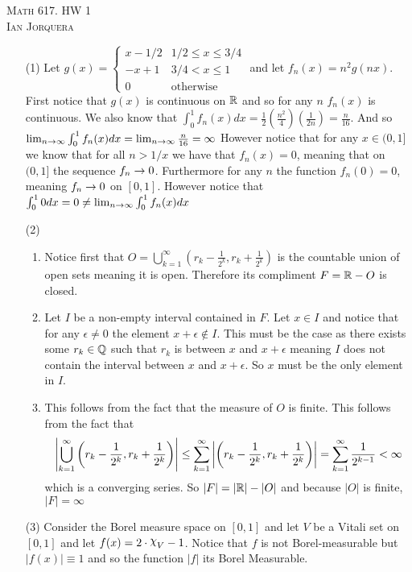 \documentclass[12pt]{amsart}
\DeclareRobustCommand{\rchi}{{\mathpalette\irchi\relax}}
\newcommand{\irchi}[2]{\raisebox{\depth}{$#1\chi$}} %
\begin{document}
\begin{center}
   \textsc{Math 617. HW 1\\ Ian Jorquera}
\end{center}
\vspace{1em}

\begin{itemize}
   \item[(1)] 
   Let $g(x)=\begin{cases}
    x-1/2 & 1/2\leq x\leq 3/4\\
    -x+1 & 3/4< x\leq 1\\
    0 & \text{otherwise}
   \end{cases}$ and let $f_n(x)=n^2g(nx)$. First notice that $g(x)$ is continuous on $\mathbb{R}$ and so for any $n$ $f_n(x)$ is continuous.
   We also know that $\int_0^1f_n(x)dx=\frac{1}{2}(\frac{n^2}{4})(\frac{1}{2n})=\frac{n}{16}$. And so 
   $\lim_{n\rightarrow\infty}\int_0^1f_n(x)dx=\lim_{n\rightarrow\infty}\frac{n}{16}=\infty$
   However notice that for any $x\in(0,1]$ we know that for all $n>1/x$ we have that $f_n(x)=0$, meaning that on 
   $(0,1]$ the sequence $f_n\rightarrow 0$. Furthermore for any $n$ the function $f_n(0)=0$, meaning
   $f_n\rightarrow 0$ on $[0,1]$. However notice that $\int_0^1 0 dx=0\neq \lim_{n\rightarrow\infty}\int_0^1f_n(x)dx$

    \item[(2)] 
    \begin{enumerate}[label= (\alph*)]
        \item Notice first that $O = \bigcup_{k=1}^{\infty} (r_k-\frac{1}{2^k}, r_k+\frac{1}{2^k})$ 
    is the countable union of open sets meaning it is open. Therefore its compliment $F=\mathbb{R}-O$ is closed.
        \item Let $I$ be a non-empty interval contained in $F$. Let $x\in I$ and notice that for any 
              $\epsilon\neq0$ the element $x+\epsilon\not\in I$. This must be the case as there exists some
              $r_k\in \mathbb{Q}$ such that $r_k$ is between $x$ and $x+\epsilon$ meaning $I$ does not contain the interval
              between $x$ and $x+\epsilon$. So $x$ must be the only element in $I$.

        \item This follows from the fact that the measure of $O$ is finite. This follows from the fact 
        that 
        \[\left\vert \bigcup_{k=1}^{\infty} \left(r_k-\frac{1}{2^k}, r_k+\frac{1}{2^k}\right) \right\vert
        \leq \sum_{k=1}^{\infty} \left\vert \left(r_k-\frac{1}{2^k}, r_k+\frac{1}{2^k}\right) \right\vert
        = \sum_{k=1}^{\infty} \frac{1}{2^{k-1}}< \infty\]
        which is a converging series. So $|F|=|\mathbb{R}|-|O|$ and because $|O|$ is finite, $|F|=\infty$
    \end{enumerate}
    \item[(3)] Consider the Borel measure space on $[0,1]$ and let $V$ be a Vitali set on $[0,1]$ and let 
    $f(x)=2\cdot\rchi_V-1$. Notice that $f$ is not Borel-measurable but $|f(x)|\equiv 1$ and so the function $|f|$ its
    Borel Measurable. 


\end{itemize}
\end{document}
